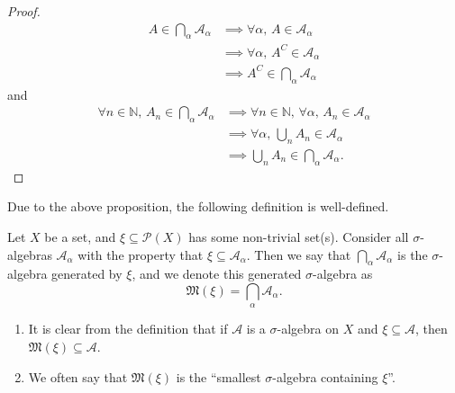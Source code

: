 \documentclass[notoc,notitlepage]{tufte-book}
\begin{document}
\begin{proof}
  \begin{align*}
  A \in \bigcap_{\alpha} \mathcal{A}_\alpha
  &\implies \forall \alpha,\, A \in \mathcal{A}_\alpha \\
  &\implies \forall \alpha,\, A^C \in \mathcal{A}_\alpha \\
  &\implies A^C \in \bigcap_{\alpha} \mathcal{A}_\alpha
  \end{align*}
  and
  \begin{align*}
  \forall n \in \mathbb{N},\, A_n \in \bigcap_{\alpha} \mathcal{A}_\alpha
  &\implies \forall n \in \mathbb{N},\, \forall \alpha,\,
    A_n \in \mathcal{A}_\alpha \\
  &\implies \forall \alpha,\, \bigcup_{n} A_n \in \mathcal{A}_\alpha \\
  &\implies \bigcup_{n} A_n \in \bigcap_{\alpha} \mathcal{A}_\alpha.
  \end{align*}
\end{proof}

Due to the above proposition, the following definition is well-defined.

\begin{defn}\label{defn:generator_of_a_sigma_algebra}
  Let $X$ be a set, and $\xi \subseteq \mathcal{P}(X)$ has some
  non-trivial set(s).
  Consider all $\sigma$-algebras $\mathcal{A}_\alpha$
  with the property that $\xi \subseteq \mathcal{A}_\alpha$.
  Then we say that $\bigcap_{\alpha} \mathcal{A}_\alpha$
  is the $\sigma$-algebra generated by $\xi$,
  and we denote this generated $\sigma$-algebra as
  \begin{equation*}
    \mathfrak{M}(\xi) = \bigcap_{\alpha} \mathcal{A}_\alpha.
  \end{equation*}
\end{defn}

\begin{remark}
  \begin{enumerate}
    \item It is clear from the definition that if $\mathcal{A}$
      is a $\sigma$-algebra on $X$ and $\xi \subseteq \mathcal{A}$,
      then $\mathfrak{M}(\xi) \subseteq \mathcal{A}$.
    \item We often say that $\mathfrak{M}(\xi)$ is the
      ``smallest $\sigma$-algebra containing $\xi$''.
  \end{enumerate}
\end{remark}
\end{document}
